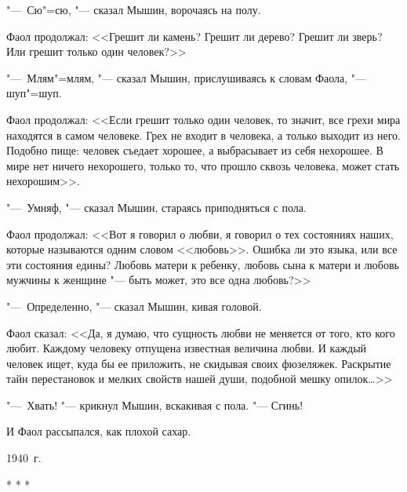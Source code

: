 "---~Сю"=сю, "--- сказал Мышин, ворочаясь на полу.

Фаол продолжал: <<Грешит ли камень? Грешит ли дерево? Грешит ли зверь?
Или грешит только один человек?>>

"---~Млям"=млям, "--- сказал Мышин, прислушиваясь к словам Фаола, "--- шуп"=шуп.

Фаол продолжал: <<Если грешит только один человек, то значит, все грехи
мира находятся в самом человеке. Грех не входит в человека, а только выходит
из него. Подобно пище: человек съедает хорошее, а выбрасывает из себя нехорошее.
В мире нет ничего нехорошего, только то, что прошло сквозь человека, может
стать нехорошим>>.

"---~Умняф, "--- сказал Мышин, стараясь приподняться с пола.

Фаол продолжал: <<Вот я говорил о любви, я говорил о тех состояниях наших,
которые называются одним словом <<любовь>>. Ошибка ли это языка, или все эти
состояния едины? Любовь матери к ребенку, любовь сына к матери и любовь
мужчины к женщине "--- быть может, это все одна любовь?>>

"---~Определенно, "--- сказал Мышин, кивая головой.

Фаол сказал: <<Да, я думаю, что сущность любви не меняется от того, кто
кого любит. Каждому человеку отпущена известная величина любви. И каждый
человек ищет, куда бы ее приложить, не скидывая своих фюзеляжек.
Раскрытие тайн перестановок и мелких свойств нашей души, подобной
мешку опилок\dots>>

"---~Хвать! "--- крикнул Мышин, вскакивая с пола. "--- Сгинь!

И Фаол рассыпался, как плохой сахар.

\begin{flushright}
1940~г.
\end{flushright}

\begin{center}
* * *
\end{center}